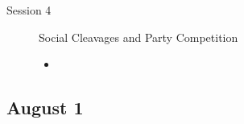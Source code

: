 \documentclass[12p,a4]{article}
\begin{document}
\begin{description}
\item[Session 4] {Social Cleavages and Party Competition}				

    \begin{itemize}
       \item \citet[Chapter 6]{grotz2023political} 
    \end{itemize}


                \end{description}

\subsection*{August 1}
\end{document}
